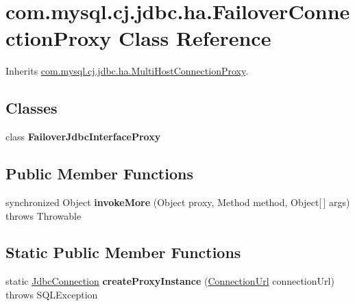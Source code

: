 \hypertarget{classcom_1_1mysql_1_1cj_1_1jdbc_1_1ha_1_1_failover_connection_proxy}{}\section{com.\+mysql.\+cj.\+jdbc.\+ha.\+Failover\+Connection\+Proxy Class Reference}
\label{classcom_1_1mysql_1_1cj_1_1jdbc_1_1ha_1_1_failover_connection_proxy}


Inherits \mbox{\hyperlink{classcom_1_1mysql_1_1cj_1_1jdbc_1_1ha_1_1_multi_host_connection_proxy}{com.\+mysql.\+cj.\+jdbc.\+ha.\+Multi\+Host\+Connection\+Proxy}}.

\subsection*{Classes}
\begin{DoxyCompactItemize}
\item 
class {\bfseries Failover\+Jdbc\+Interface\+Proxy}
\end{DoxyCompactItemize}
\subsection*{Public Member Functions}
\begin{DoxyCompactItemize}
\item 
\mbox{\label{classcom_1_1mysql_1_1cj_1_1jdbc_1_1ha_1_1_failover_connection_proxy_ad05c49207de1dc3e35f5f56461f70036}} 
synchronized Object {\bfseries invoke\+More} (Object proxy, Method method, Object\mbox{[}$\,$\mbox{]} args)  throws Throwable 
\end{DoxyCompactItemize}
\subsection*{Static Public Member Functions}
\begin{DoxyCompactItemize}
\item 
\mbox{\label{classcom_1_1mysql_1_1cj_1_1jdbc_1_1ha_1_1_failover_connection_proxy_ae28f0509d52d59d9da141399ea8d3fc4}} 
static \mbox{\hyperlink{interfacecom_1_1mysql_1_1cj_1_1jdbc_1_1_jdbc_connection}{Jdbc\+Connection}} {\bfseries create\+Proxy\+Instance} (\mbox{\hyperlink{classcom_1_1mysql_1_1cj_1_1conf_1_1_connection_url}{Connection\+Url}} connection\+Url)  throws S\+Q\+L\+Exception 
\end{DoxyCompactItemize}

